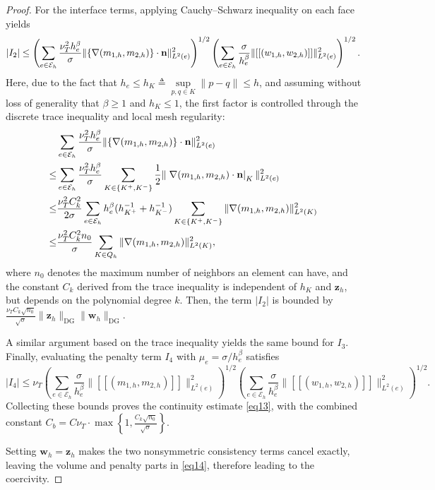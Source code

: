 \documentclass[10pt,a4paper]{amsart}
\begin{document}
\begin{proof}
For the interface terms, applying Cauchy--Schwarz inequality on each face yields
\begin{equation}\notag
|I_2|
\le
\left(
\sum_{e\in \mathcal{E}_h}\frac{\nu_T^2h_e^\beta}{\sigma}\|\{\nabla (m_{1,h},m_{2,h})\}\cdot \mathbf{n}\|_{L^2(e)}^2
\right)^{1/2}
\left(
\sum_{e\in \mathcal{E}_h}\frac{\sigma}{h_e^\beta}\|[[ (w_{1,h},w_{2,h})]]\|_{L^2(e)}^2
\right)^{1/2}.
\end{equation}
Here, due to the fact that $h_e \le h_K \triangleq \sup\limits_{p, q \in K}\|p-q\| \le h$, and assuming without loss of generality that $\beta \ge 1$ and $h_K \le 1$, the first factor is controlled through the discrete trace inequality and local mesh regularity:
\begin{equation}\notag
\begin{aligned}
&\sum_{e\in \mathcal{E}_h}\frac{\nu_T^2h_e^\beta}{\sigma}\|\{\nabla (m_{1,h},m_{2,h})\}\cdot \mathbf{n}\|_{L^2(e)}^2\\
\le& \sum_{e \in \mathcal{E}_h} \frac{\nu_T^2h_e^\beta}{\sigma}\sum_{K \in \{K^+,K^-\}}\frac{1}{2} \| \left.\nabla (m_{1,h},m_{2,h})\cdot \mathbf{n} \right|_{K}\|_{L^2(e)}^2  \\
\le& \frac{\nu_T^2C_k^2}{2\sigma}\sum_{e \in \mathcal{E}_h} h_e^\beta (h_{K^+}^{-1} + h_{K^-}^{-1}) \sum_{K \in \{K^+,K^-\}} \|\nabla (m_{1,h},m_{2,h})\|_{L^2(K)}^2 \\
\le& 
\frac{\nu_T^2C_k^2 n_0}{\sigma} \sum_{K\in Q_h} \|\nabla (m_{1,h},m_{2,h})\|_{L^2(K)}^2,
\end{aligned}
\end{equation}
where $n_0$ denotes the maximum number of neighbors an element can have, and the constant $C_k$ derived from the trace inequality is independent of $h_K$ and $\mathbf{z}_h$, but depends on the polynomial degree $k$. Then, the term $|I_2|$ is bounded by $\frac{\nu_T C_k \sqrt{n_0}}{\sqrt{\sigma}}\|\mathbf{z}_h\|_{\mathrm{DG}}\|\mathbf{w}_h\|_{\mathrm{DG}}$.

A similar argument based on the trace inequality yields the same bound for $I_3$. Finally, evaluating the penalty term $I_4$ with $\mu_e = \sigma/h_e^\beta$ satisfies
\[
|I_4|
\le \nu_T
\left(
\sum_{e\in \mathcal{E}_h}\frac{\sigma}{h_e^\beta}
\|[[(m_{1,h},m_{2,h})]]\|_{L^2(e)}^2
\right)^{1/2}
\left(
\sum_{e \in \mathcal{E}_h}\frac{\sigma}{h_e^\beta}
\|[[(w_{1,h},w_{2,h})]]\|_{L^2(e)}^2
\right)^{1/2}.
\]
Collecting these bounds proves the continuity estimate \eqref{eq13}, with the combined constant $C_b=C \nu_T \cdot \max \left\{1,\frac{C_k \sqrt{n_0}}{\sqrt{\sigma}}\right\}$.

Setting $\mathbf w_h=\mathbf z_h$ makes the two nonsymmetric consistency terms cancel exactly, leaving the volume and penalty parts in \eqref{eq14},
therefore leading to the coercivity.
\end{proof}
\end{document}
